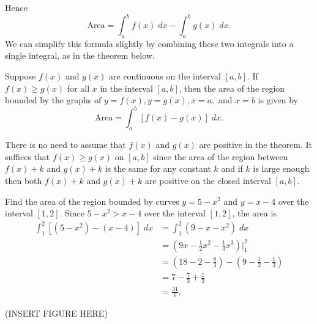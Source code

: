 \documentclass{ximera}
\begin{document}
Hence
\[
\text{Area} = \int_a^b f(x) \; dx - \int_a^b g(x) \; dx.
\]
We can simplify this formula slightly by combining these two integrals into a single integral, as in the theorem below. 


\begin{theorem}
Suppose $f(x)$ and $g(x)$ are continuous on the interval $[a,b]$. If $f(x) \geq g(x)$ for all $x$ in the interval $[a,b]$, 
then the area of the region bounded by the graphs of $y = f(x), y=g(x), x=a,$ and $x=b$ is given by  
\[
\text{Area} = \int_a^b \left[f(x) -g(x)\right] \; dx.
\]
\end{theorem}


\begin{remark}
There is no need to assume that $f(x)$ and $g(x)$ are positive in the theorem.  It suffices that $f(x) \geq g(x)$ on $[a,b]$ since the area of the region between 
$f(x) + k$ and $g(x) + k$ is the same for any constant $k$ and if $k$ is large enough then both $f(x) + k$ and $g(x) + k$ are positive
on the closed interval $[a,b]$.
\end{remark}




\begin{example} %
Find the area of the region bounded by curves $y = 5 - x^2$ and $y = x-4$ over the interval $[1,2]$.
Since $5 - x^2 > x-4$ over the interval $[1,2]$, the area is
\begin{align*}
\int_1^2 \left[(5-x^2) - (x-4)\right] \; dx &= \int_1^2 \left(9-x-x^2\right) \; dx \\
                                           &= \left(9x - \frac12 x^2 - \frac13 x^3 \right) \bigg|_1^2 \\
                                           &= \left(18 - 2 - \frac83 \right) - \left(9 - \frac12 - \frac13 \right)\\
                                           &= 7 - \frac73 + \frac12 \\
                                           & = \frac{31}{6}.
\end{align*}
                                           
(INSERT FIGURE HERE)

\end{example}
\end{document}
